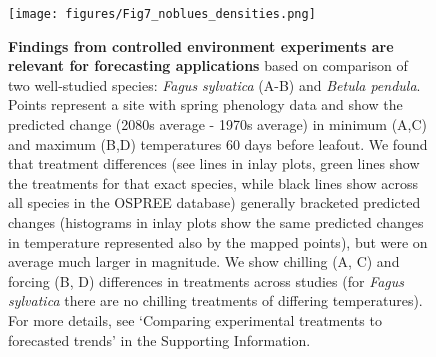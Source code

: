 \documentclass[11pt,letter]{article}
\begin{document}
\clearpage

\begin{figure}[t!]
\centering
\texttt{[image: figures/Fig7\_noblues\_densities.png]}
\caption{{\bf Findings from controlled environment experiments are relevant for forecasting applications} based on comparison of two well-studied species: \emph{Fagus sylvatica} (A-B) and \emph{Betula pendula}. Points represent a site with spring phenology data  \citep[from the PEP725 database,][]{Templ2018} and show the predicted change (2080s average - 1970s average) in minimum (A,C) and maximum (B,D) temperatures 60 days before leafout. We found that treatment differences (see lines in inlay plots, green lines show the treatments for that exact species, while black lines show across all species in the OSPREE database) generally bracketed predicted changes (histograms in inlay plots show the same predicted changes in temperature represented also by the mapped points), but were on average much larger in magnitude. We show chilling (A, C) and forcing (B, D) differences in treatments across studies (for \emph{Fagus sylvatica} there are no chilling treatments of differing temperatures). For more details, see `Comparing experimental treatments to forecasted trends' in the Supporting Information.}
\label{fig:pep} %
\end{figure}
\end{document}

